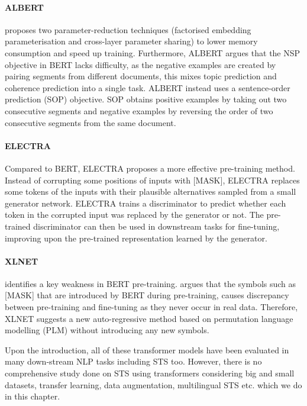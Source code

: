 \paragraph{ALBERT} \autocite{Lan2020ALBERT} proposes two parameter-reduction techniques (factorised embedding parameterisation and cross-layer parameter sharing) to lower memory consumption and speed up training. Furthermore, ALBERT \autocite{Lan2020ALBERT} argues that the NSP objective in BERT lacks difficulty, as the negative examples are created by pairing segments from different documents, this mixes topic prediction and coherence prediction into a single task. ALBERT instead uses a sentence-order prediction
(SOP) objective. SOP obtains positive examples by taking out two consecutive segments and negative examples by reversing the order of two consecutive segments from the same document.


\paragraph{ELECTRA} Compared to BERT, ELECTRA \autocite{Clark2020ELECTRA} proposes a more effective pre-training method. Instead of corrupting some positions of inputs with [MASK], ELECTRA replaces some tokens of the inputs with their plausible alternatives sampled from a small generator network. ELECTRA trains a discriminator to predict whether each token in the corrupted input was replaced by the generator or not. The pre-trained discriminator can then be used in downstream tasks for fine-tuning, improving upon the pre-trained representation learned by the generator.

\paragraph{XLNET} \autocite{yang2019xlnet} identifies a key weakness in BERT pre-training. \autocite{yang2019xlnet} argues that the symbols such as \textsc{[MASK]} that are introduced by BERT during pre-training, causes discrepancy between pre-training and fine-tuning as they never occur in real data. Therefore, XLNET suggests a new auto-regressive method based on permutation language modelling (PLM) \autocite{JMLR:v17:16-272} without introducing any new symbols. 

Upon the introduction, all of these transformer models have been evaluated in many down-stream NLP tasks including STS too. However, there is no comprehensive study done on STS using transformers considering big and small datasets, transfer learning, data augmentation, multilingual STS etc. which we do in this chapter.

